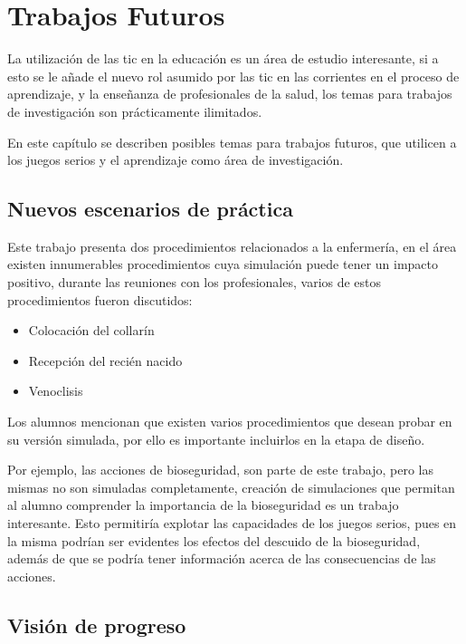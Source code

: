 \chapter{Trabajos Futuros}
\label{chap:futuro}

La utilización de las \Gls{tic} en la educación es un área de estudio interesante,
si a esto se le añade el nuevo rol asumido por las \Gls{tic} en las corrientes en el 
proceso de aprendizaje, y la enseñanza de profesionales de la salud, los temas para 
trabajos de investigación son prácticamente ilimitados. 

En este capítulo se describen posibles temas para trabajos futuros, que utilicen
a los juegos serios y el aprendizaje como área de investigación.

\section{Nuevos escenarios de práctica}
Este trabajo presenta dos procedimientos relacionados a la enfermería, en el
área existen innumerables procedimientos cuya simulación puede tener un impacto
positivo, durante las reuniones con los profesionales, varios de estos
procedimientos fueron discutidos:

\begin{itemize}
    \item Colocación del collarín
    \item Recepción del recién nacido
    \item Venoclisis
\end{itemize}

Los alumnos mencionan que existen varios procedimientos que desean probar en su
versión simulada, por ello es importante incluirlos en la etapa de diseño.

Por ejemplo, las acciones de bioseguridad, son parte de este trabajo, pero las
mismas no son simuladas completamente, creación de simulaciones que permitan al
alumno comprender la importancia de la bioseguridad es un trabajo interesante.
Esto permitiría explotar las capacidades de los juegos serios, pues en la misma
podrían ser evidentes los efectos del descuido de la bioseguridad, además de que
se podría tener información acerca de las consecuencias de las acciones.

\section{Visión de progreso}

